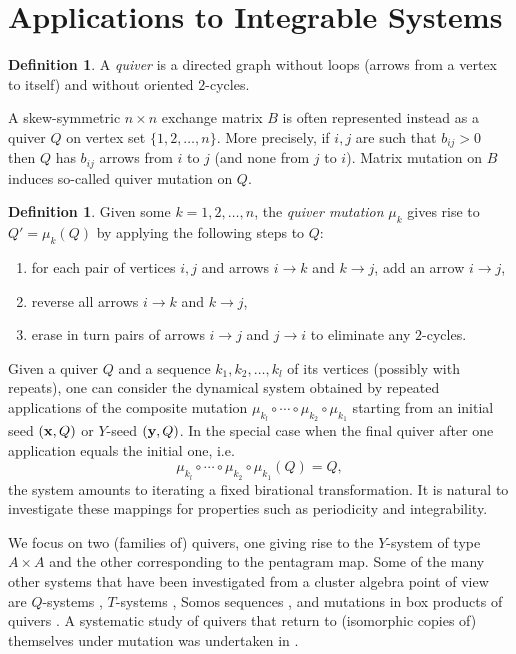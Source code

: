\documentclass{amsart}
\theoremstyle{definition}
\newtheorem{definition}[theorem]{Definition}
\theoremstyle{remark}
\numberwithin{equation}{section}
\newcommand{\x}{{\bf x}}
\newcommand{\y}{{\bf y}}
\begin{document}
\section{Applications to Integrable Systems}\label{sec:integrable_systems}
	\begin{definition}
		A \emph{quiver} is a directed graph without loops (arrows from a vertex to itself) and without oriented $2$-cycles.
	\end{definition}
	
	A skew-symmetric $n\times n$ exchange matrix $B$ is often represented instead as a quiver $Q$ on vertex set $\{1,2,\ldots, n\}$.  More precisely, if $i,j$ are such that $b_{ij}>0$ then $Q$ has $b_{ij}$ arrows from $i$ to $j$ (and none from $j$ to $i$).  Matrix mutation on $B$ induces so-called quiver mutation on $Q$.
	
	\begin{definition}
		Given some $k=1,2,\ldots, n$, the \emph{quiver mutation} $\mu_k$ gives rise to $Q' = \mu_k(Q)$ by applying the following steps to $Q$:
		\begin{enumerate}
		\item for each pair of vertices $i,j$ and arrows $i\to k$ and $k \to j$, add an arrow $i \to j$,
		\item reverse all arrows $i \to k$ and $k \to j$,
		\item erase in turn pairs of arrows $i \to j$ and $j \to i$ to eliminate any $2$-cycles.
		\end{enumerate}
	\end{definition}
	
	Given a quiver $Q$ and a sequence $k_1,k_2,\ldots, k_l$ of its vertices (possibly with repeats), one can consider the dynamical system obtained by repeated applications of the composite mutation $\mu_{k_l} \circ \cdots \circ \mu_{k_2} \circ \mu_{k_1}$ starting from an initial seed $(\x, Q)$ or $Y$-seed $(\y,Q)$.  In the special case when the final quiver after one application equals the initial one, i.e.
	\begin{displaymath}
		\mu_{k_l} \circ \cdots \circ \mu_{k_2} \circ \mu_{k_1}(Q) = Q,
	\end{displaymath}
	the system amounts to iterating a fixed birational transformation.  It is natural to investigate these mappings for properties such as periodicity and integrability.  
	
	We focus on two (families of) quivers, one giving rise to the $Y$-system of type $A \times A$ and the other corresponding to the pentagram map. Some of the many other systems that have been investigated from a cluster algebra point of view are $Q$-systems \cite{dFK10}, $T$-systems \cite{dFK09}, Somos sequences \cite{H07}, and mutations in box products of quivers \cite{P15}. A systematic study of quivers that return to (isomorphic copies of) themselves under mutation was undertaken in \cite{FM11}.
\end{document}
